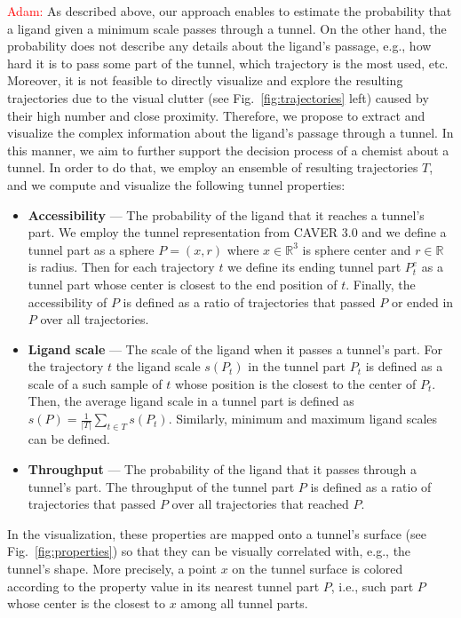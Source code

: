 \documentclass{svmult}
\newcommand{\red}[1]{\textcolor{red}{#1}}
\begin{document}
\red{Adam: }
As described above, our approach enables to estimate the probability that a ligand given a minimum scale passes through a tunnel.
On the other hand, the probability does not describe any details about the ligand's passage, e.g., how hard it is to pass some part of the tunnel, which trajectory is the most used, etc.
Moreover, it is not feasible to directly visualize and explore the resulting trajectories due to the visual clutter (see Fig.~\ref{fig:trajectories} left) caused by their high number and close proximity.
Therefore, we propose to extract and visualize the complex information about the ligand's passage through a tunnel.
In this manner, we aim to further support the decision process of a chemist about a tunnel.
In order to do that, we employ an ensemble of resulting trajectories $T$, and we compute and visualize the following tunnel properties:
\begin{itemize}
  \item \textbf{Accessibility} --- The probability of the ligand that it reaches a tunnel's part.
We employ the tunnel representation from CAVER 3.0 and we define a tunnel part as a sphere $P = (x, r)$ where $x \in \mathbb{R}^3$ is sphere center and $r \in \mathbb{R}$ is radius.
Then for each trajectory $t$ we define its ending tunnel part $P_t^e$ as a tunnel part whose center is closest to the end position of $t$.
Finally, the accessibility of $P$ is defined as a ratio of trajectories that passed $P$ or ended in $P$ over all trajectories.
  \item \textbf{Ligand scale} --- The scale of the ligand when it passes a tunnel's part.
For the trajectory $t$ the ligand scale $s(P_t)$ in the tunnel part $P_t$ is defined as a scale of a such sample of $t$ whose position is the closest to the center of $P_t$.
Then, the average ligand scale in a tunnel part is defined as $s(P) = \frac{1}{|T|} \sum_{t \in T} s(P_t)$.
Similarly, minimum and maximum ligand scales can be defined.
  \item \textbf{Throughput} --- The probability of the ligand that it passes through a tunnel's part.
The throughput of the tunnel part $P$ is defined as a ratio of trajectories that passed $P$ over all trajectories that reached $P$.
\end{itemize}
In the visualization, these properties are mapped onto a tunnel's surface (see Fig.~\ref{fig:properties}) so that they can be visually correlated with, e.g., the tunnel's shape.
More precisely, a point $x$ on the tunnel surface is colored according to the property value in its nearest tunnel part $P$, i.e., such part $P$ whose center is the closest to $x$ among all tunnel parts.
\end{document}
